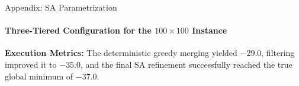 \documentclass[10pt, aspectratio=169]{beamer}
\begin{document}
\begin{frame}{Appendix: SA Parametrization}
\framesubtitle{Three-Tiered Configuration for the $100 \times 100$ Instance}
    \textbf{Execution Metrics:} The deterministic greedy merging yielded $-29.0$, filtering improved it to $-35.0$, and the final SA refinement successfully reached the true global minimum of $-37.0$.
    \vspace{0.4cm}

    \begin{table}[]
        \centering
        \renewcommand{\arraystretch}{1.2}
    \end{table}
\end{frame}
\end{document}
